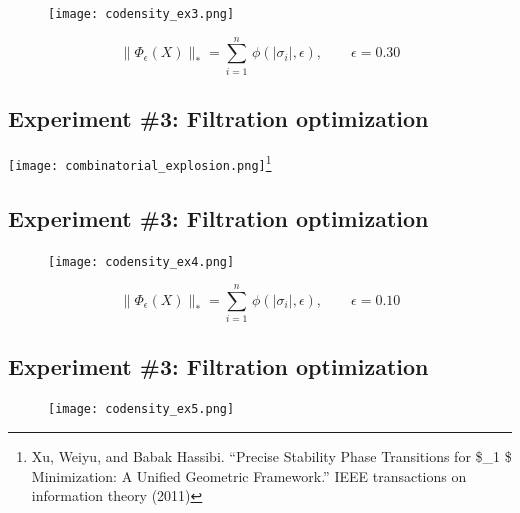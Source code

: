\documentclass[
  letterpaper,
  DIV=11,
  numbers=noendperiod,
  oneside]{scrartcl}
\begin{document}
\begin{figure}

{\centering \texttt{[image: codensity\_ex3.png]}

}

\end{figure}

\[
\lVert \Phi_\epsilon(X) \rVert_\ast = \sum\limits_{i=1}^{n} \, \phi(\lvert \sigma_i \rvert, \epsilon), \quad \quad \epsilon = 0.30
\]

\hypertarget{experiment-3-filtration-optimization-5}{%
\subsection{Experiment \#3: Filtration
optimization}\label{experiment-3-filtration-optimization-5}}

\texttt{[image: combinatorial\_explosion.png]}\footnote{Xu, Weiyu, and
  Babak Hassibi. ``Precise Stability Phase Transitions for \$\ell\_1 \$
  Minimization: A Unified Geometric Framework.'' IEEE transactions on
  information theory (2011)}

\hypertarget{experiment-3-filtration-optimization-6}{%
\subsection{Experiment \#3: Filtration
optimization}\label{experiment-3-filtration-optimization-6}}

\begin{figure}

{\centering \texttt{[image: codensity\_ex4.png]}

}

\end{figure}

\[
\lVert \Phi_\epsilon(X) \rVert_\ast = \sum\limits_{i=1}^{n} \, \phi(\lvert \sigma_i \rvert, \epsilon), \quad \quad \epsilon = 0.10
\]

\hypertarget{experiment-3-filtration-optimization-7}{%
\subsection{Experiment \#3: Filtration
optimization}\label{experiment-3-filtration-optimization-7}}

\begin{figure}

{\centering \texttt{[image: codensity\_ex5.png]}

}

\end{figure}
\end{document}
